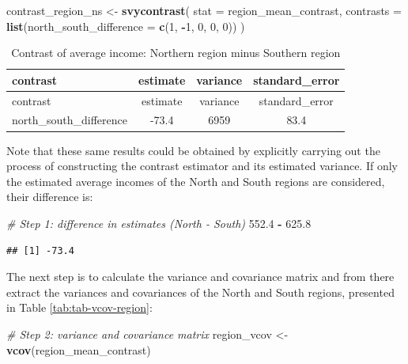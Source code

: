 \documentclass[
  english,
  12pt,
]{book}
\newenvironment{Shaded}{\begin{snugshade}}{\end{snugshade}}
\newcommand{\AttributeTok}[1]{\textcolor[rgb]{0.13,0.29,0.53}{#1}}
\newcommand{\CommentTok}[1]{\textcolor[rgb]{0.56,0.35,0.01}{\textit{#1}}}
\newcommand{\DecValTok}[1]{\textcolor[rgb]{0.00,0.00,0.81}{#1}}
\newcommand{\FloatTok}[1]{\textcolor[rgb]{0.00,0.00,0.81}{#1}}
\newcommand{\FunctionTok}[1]{\textcolor[rgb]{0.13,0.29,0.53}{\textbf{#1}}}
\newcommand{\NormalTok}[1]{#1}
\newcommand{\OtherTok}[1]{\textcolor[rgb]{0.56,0.35,0.01}{#1}}
\newcommand{\SpecialCharTok}[1]{\textcolor[rgb]{0.81,0.36,0.00}{\textbf{#1}}}
\begin{document}
\begin{Shaded}
\begin{Highlighting}[]
\NormalTok{contrast\_region\_ns }\OtherTok{\textless{}{-}} \FunctionTok{svycontrast}\NormalTok{(}
  \AttributeTok{stat =}\NormalTok{ region\_mean\_contrast,}
  \AttributeTok{contrasts =} \FunctionTok{list}\NormalTok{(}\AttributeTok{north\_south\_difference =} \FunctionTok{c}\NormalTok{(}\DecValTok{1}\NormalTok{, }\SpecialCharTok{{-}}\DecValTok{1}\NormalTok{, }\DecValTok{0}\NormalTok{, }\DecValTok{0}\NormalTok{, }\DecValTok{0}\NormalTok{))}
\NormalTok{)}
\end{Highlighting}
\end{Shaded}

\begin{longtable}[]{@{}lccc@{}}
\caption{\label{tab:tab-contraste-ns}Contrast of average income: Northern region minus Southern region}\tabularnewline
\toprule\noalign{}
contrast & estimate & variance & standard\_error \\
\midrule\noalign{}
\endfirsthead
\toprule\noalign{}
contrast & estimate & variance & standard\_error \\
\midrule\noalign{}
\endhead
\bottomrule\noalign{}
\endlastfoot
north\_south\_difference & -73.4 & 6959 & 83.4 \\
\end{longtable}

Note that these same results could be obtained by explicitly carrying out the process of constructing the contrast estimator and its estimated variance. If only the estimated average incomes of the North and South regions are considered, their difference is:

\begin{Shaded}
\begin{Highlighting}[]
\CommentTok{\# Step 1: difference in estimates (North {-} South)}
\FloatTok{552.4} \SpecialCharTok{{-}} \FloatTok{625.8}
\end{Highlighting}
\end{Shaded}

\begin{verbatim}
## [1] -73.4
\end{verbatim}

The next step is to calculate the variance and covariance matrix and from there extract the variances and covariances of the North and South regions, presented in Table \ref{tab:tab-vcov-region}:

\begin{Shaded}
\begin{Highlighting}[]
\CommentTok{\# Step 2: variance and covariance matrix}
\NormalTok{region\_vcov }\OtherTok{\textless{}{-}} \FunctionTok{vcov}\NormalTok{(region\_mean\_contrast)}
\end{Highlighting}
\end{Shaded}
\end{document}
